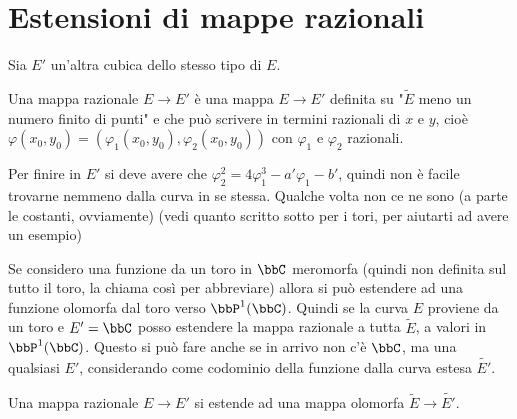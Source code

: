 \section{Estensioni di mappe razionali}
Sia $E'$ un'altra cubica dello stesso tipo di $E$.

\begin{definizione}
Una mappa razionale $E\rightarrow E'$ è una mappa $E\rightarrow E'$ definita su "$\tilde{E}$ meno un numero finito di punti" e che può scrivere in termini razionali di $x$ e $y$, cioè $\varphi(x_0,y_0)=(\varphi_1(x_0,y_0),\varphi_2(x_0,y_0) )$ con $\varphi_1$ e $\varphi_2$ razionali.
\end{definizione}

\begin{osservazione}
Per finire in $E'$ si deve avere che $\varphi_2^2=4\varphi_1^3-a'\varphi_1-b'$, quindi non è facile trovarne nemmeno dalla curva in se stessa. Qualche volta non ce ne sono (a parte le costanti, ovviamente) (vedi quanto scritto sotto per i tori, per aiutarti ad avere un esempio)
\end{osservazione}

Se considero una funzione da un toro in $\bbC$ meromorfa (quindi non definita sul tutto il toro, la chiama così per abbreviare) allora si può estendere ad una funzione olomorfa dal toro verso $\bbP^1(\bbC)$.
Quindi se la curva $E$ proviene da un toro e $E'=\bbC$ posso estendere la mappa razionale a tutta $\tilde{E}$, a valori in $\bbP^1(\bbC)$.
Questo si può fare anche se in arrivo non c'è $\bbC$, ma una qualsiasi $E'$, considerando come codominio della funzione dalla curva estesa $\tilde{E'}$.

\begin{proposizione}
Una mappa razionale $E\rightarrow E'$ si estende ad una mappa olomorfa $\tilde{E} \rightarrow \tilde {E'}$.
\end{proposizione}

